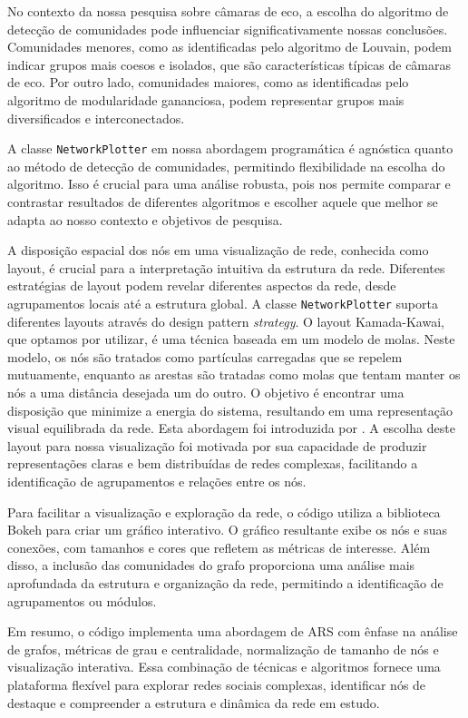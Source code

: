 No contexto da nossa pesquisa sobre câmaras de eco, a escolha do algoritmo de detecção de comunidades pode influenciar significativamente nossas conclusões. Comunidades menores, como as identificadas pelo algoritmo de Louvain, podem indicar grupos mais coesos e isolados, que são características típicas de câmaras de eco. Por outro lado, comunidades maiores, como as identificadas pelo algoritmo de modularidade gananciosa, podem representar grupos mais diversificados e interconectados.

A classe \texttt{NetworkPlotter} em nossa abordagem programática é agnóstica quanto ao método de detecção de comunidades, permitindo flexibilidade na escolha do algoritmo. Isso é crucial para uma análise robusta, pois nos permite comparar e contrastar resultados de diferentes algoritmos e escolher aquele que melhor se adapta ao nosso contexto e objetivos de pesquisa.

A disposição espacial dos nós em uma visualização de rede, conhecida como layout, é crucial para a interpretação intuitiva da estrutura da rede. Diferentes estratégias de layout podem revelar diferentes aspectos da rede, desde agrupamentos locais até a estrutura global. A classe \texttt{NetworkPlotter} suporta diferentes layouts através do design pattern \textit{strategy}. O layout Kamada-Kawai, que optamos por utilizar, é uma técnica baseada em um modelo de molas. Neste modelo, os nós são tratados como partículas carregadas que se repelem mutuamente, enquanto as arestas são tratadas como molas que tentam manter os nós a uma distância desejada um do outro. O objetivo é encontrar uma disposição que minimize a energia do sistema, resultando em uma representação visual equilibrada da rede. Esta abordagem foi introduzida por . A escolha deste layout para nossa visualização foi motivada por sua capacidade de produzir representações claras e bem distribuídas de redes complexas, facilitando a identificação de agrupamentos e relações entre os nós.

Para facilitar a visualização e exploração da rede, o código utiliza a biblioteca Bokeh para criar um gráfico interativo. O gráfico resultante exibe os nós e suas conexões, com tamanhos e cores que refletem as métricas de interesse. Além disso, a inclusão das comunidades do grafo proporciona uma análise mais aprofundada da estrutura e organização da rede, permitindo a identificação de agrupamentos ou módulos.

Em resumo, o código implementa uma abordagem de ARS com ênfase na análise de grafos, métricas de grau e centralidade, normalização de tamanho de nós e visualização interativa. Essa combinação de técnicas e algoritmos fornece uma plataforma flexível para explorar redes sociais complexas, identificar nós de destaque e compreender a estrutura e dinâmica da rede em estudo.


